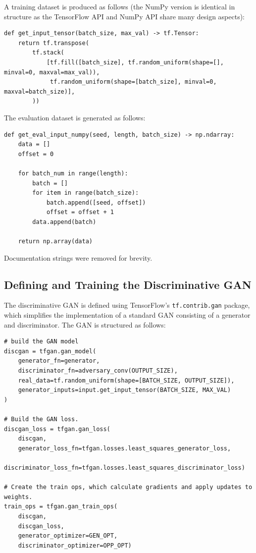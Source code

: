 \documentclass[12pt, titlepage]{report}
\theoremstyle{definition}
\begin{document}
A training dataset is produced as follows (the NumPy version is identical in structure as the TensorFlow API and NumPy API share many design aspects):

\begin{verbatim}
def get_input_tensor(batch_size, max_val) -> tf.Tensor:
    return tf.transpose(
        tf.stack(
            [tf.fill([batch_size], tf.random_uniform(shape=[], minval=0, maxval=max_val)),
             tf.random_uniform(shape=[batch_size], minval=0, maxval=batch_size)],
        ))
\end{verbatim}

The evaluation dataset is generated as follows:

\begin{verbatim}
def get_eval_input_numpy(seed, length, batch_size) -> np.ndarray:
    data = []
    offset = 0

    for batch_num in range(length):
        batch = []
        for item in range(batch_size):
            batch.append([seed, offset])
            offset = offset + 1
        data.append(batch)

    return np.array(data)
\end{verbatim}

Documentation strings were removed for brevity.



\subsection{Defining and Training the Discriminative GAN}\label{subsection:training_disc}
The discriminative GAN is defined using TensorFlow's \texttt{tf.contrib.gan} package, which simplifies the implementation of a standard GAN consisting of a generator and discriminator. The GAN is structured as follows:

\begin{verbatim}
# build the GAN model
discgan = tfgan.gan_model(
    generator_fn=generator,
    discriminator_fn=adversary_conv(OUTPUT_SIZE),
    real_data=tf.random_uniform(shape=[BATCH_SIZE, OUTPUT_SIZE]),
    generator_inputs=input.get_input_tensor(BATCH_SIZE, MAX_VAL)
)

# Build the GAN loss.
discgan_loss = tfgan.gan_loss(
    discgan,
    generator_loss_fn=tfgan.losses.least_squares_generator_loss,
    discriminator_loss_fn=tfgan.losses.least_squares_discriminator_loss)

# Create the train ops, which calculate gradients and apply updates to weights.
train_ops = tfgan.gan_train_ops(
    discgan,
    discgan_loss,
    generator_optimizer=GEN_OPT,
    discriminator_optimizer=OPP_OPT)
\end{verbatim}
\end{document}
